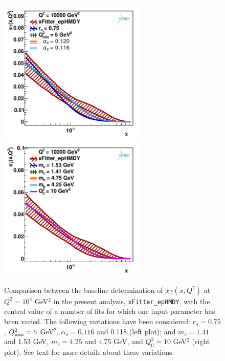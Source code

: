 \begin{figure}[t]
\centering
\includegraphics[width=7cm]{figs/q2_10000_pdf_ph_model_1.pdf}
\includegraphics[width=7cm]{figs/q2_10000_pdf_ph_model_2.pdf}
\caption{Comparison between the baseline determination of
  $x\gamma(x,Q^2)$ at $Q^2=10^4$ GeV$^2$ in the present
  analysis, {\tt xFitter\_epHMDY},
  with the central value of a number of fits for which one input parameter has been varied.
  The following variations have been considered: $r_s=0.75$, $Q^2_{\rm min}=5$ GeV$^2$, $\alpha_s=0.116$ and
  0.118 (left plot); and
  $m_c=1.41$ and 1.53 GeV, $m_b=4.25$ and 4.75 GeV, and $Q_0^2=10$ GeV$^2$ (right plot).
  See text for more details about these variations.
}
\label{fig:model}
\end{figure}

